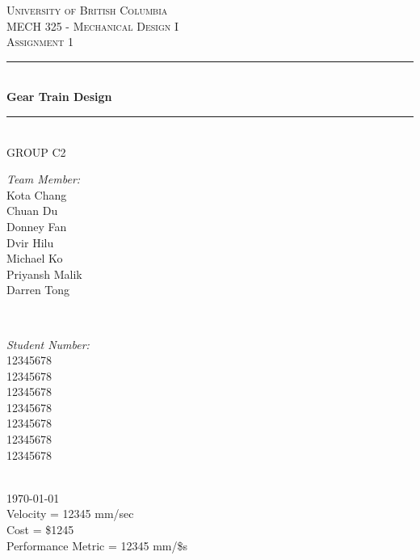 \documentclass[letterpaper,12pt]{article}
\begin{document}
	
	\begin{titlepage}
		
		\newcommand{\HRule}{\rule{\linewidth}{0.5mm}}
		
		\center
		
		\textsc{\LARGE University of British Columbia}\\[1.5cm]
		\textsc{\Large MECH 325 - Mechanical Design I}\\[0.5cm]
		\textsc{\Large Assignment 1}\\[0.5cm]
		
		\HRule \\[0.8cm]
		{ \huge \bfseries Gear Train Design}\\[0.4cm]
		\HRule \\[1cm]
		
		{\Large GROUP C2}\\
		\vspace{0.5cm}
		
		\begin{minipage}{0.4\textwidth}
			\begin{flushleft} \large
				\emph{Team Member:}\\
				Kota Chang\\
				Chuan Du\\
				Donney Fan\\
				Dvir Hilu\\
				Michael Ko\\
				Priyansh Malik\\
				Darren Tong\\
			\end{flushleft}
		\end{minipage}
		~
		\begin{minipage}{0.4\textwidth}
			\begin{flushright} \large
				\emph{Student Number:} \\
				12345678\\
				12345678\\
				12345678\\
				12345678\\
				12345678\\
				12345678\\
				12345678
			\end{flushright}
		\end{minipage}\\[2cm]
		
		{\large \today}\\[2cm]
		
		{\large
			Velocity = 12345 mm/sec\\
			Cost = \$1245\\
			Performance Metric = 12345 mm/\$s
		}
		
		
		\vfill %
		
	\end{titlepage}
	
\end{document}
